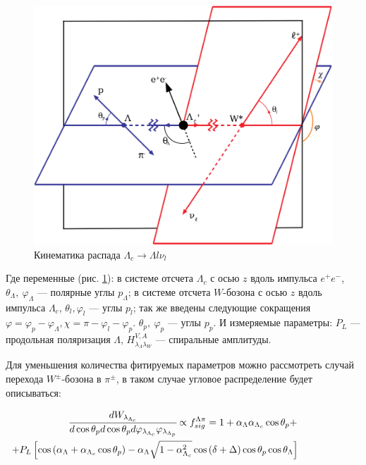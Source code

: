\documentclass[a0,portrait]{a0poster}
\newcommand{\inner}[1]{\left( #1 \right)}
\newcommand{\insqr}[1]{\left[ #1 \right]}
\renewcommand{\phi}{\varphi}
\newcommand{\llp}[1]{\lambda_{\Lambda_{#1}}}
\newcommand\tab[1][0.51cm]{\hspace*{#1}}
\begin{document}
\begin{mdframed}[style=MyFrame]
\begin{multicols}{2}
\begin{figure}
    \includegraphics[width=15cm]{img/lc_l_l_nu_def.png}%
    \captionsetup{justification=centering,margin=2cm}
    \caption{Кинематика распада $\Lambda_c \to \Lambda l \nu_l$}
    \label{kin:lepton:img}
\end{figure}



Где переменные (рис. \ref{kin:lepton:img}): в системе отсчета $\Lambda_c$ с осью $z$ вдоль импульса $e^+ e^-$, 
$\theta_\Lambda, \ \phi_\Lambda$ --- полярные углы $p_\Lambda$;  
в системе отсчета $W$-бозона с осью $z$ вдоль импульса $\Lambda_c$, $\theta_l, \phi_l$ --- углы $p_l$; 
так же введены следующие сокращения $\phi = \phi_p - \phi_\Lambda , \chi = \pi - \phi_l - \phi_p$.
$\theta_p, \ \phi_p$ --- углы $p_p$. 
И измеряемые параметры: $P_L$ --- продольная поляризация $\Lambda$, 
$H^{V, A}_{\lambda_\Lambda \lambda_W}$ --- спиральные амплитуды.

\tab Для уменьшения количества фитируемых параметров можно рассмотреть случай перехода 
$W^\pm$-бозона в $\pi^\pm$, в таком случае угловое распределение будет описываться:

\begin{multline*}
    \cfrac{dW_{\llp{c}}}{d\cos{\theta_p}d\cos{\theta_p}d\phi_{\llp{c}}\phi_{\llp{p}}} \propto f_{sig}^{\Lambda\pi} 
    =
    1 + \alpha_{\Lambda}\alpha_{\Lambda_c} \cos \theta_p + \\
    \hspace{-20mm}
    + P_L\insqr{\cos\inner{\alpha_{\Lambda} + \alpha_{\Lambda_c} \cos{\theta_p}} - 
    \alpha_{\Lambda}\sqrt{1 - \alpha_{\Lambda_c}^2}\cos\inner{\delta + \Delta}\cos\theta_p \cos \theta_\Lambda}
    \label{spin:Lam:pdf}
\end{multline*}


\end{multicols}
\end{mdframed}
\end{document}
